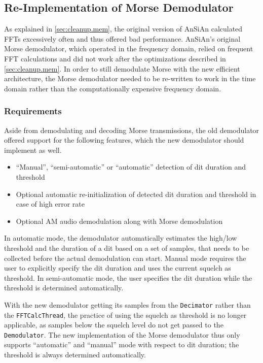 \subsection{Re-Implementation of Morse Demodulator\label{sec:morse_demod}}

As explained in \autoref{sec:cleanup.mem}, the original version of \ac{AnSiAn} calculated \acp{FFT} excessively often and thus offered bad performance. \ac{AnSiAn}'s original Morse demodulator, which operated in the frequency domain, relied on frequent \ac{FFT} calculations and did not work after the optimizations described in \autoref{sec:cleanup.mem}. In order to still demodulate Morse with the new efficient architecture, the Morse demodulator needed to be re-written to work in the time domain rather than the computationally expensive frequency domain.

\subsubsection{Requirements}

Aside from demodulating and decoding Morse transmissions, the old demodulator offered support for the following features, which the new demodulator should implement as well.

\begin{itemize}
  \item ``Manual'', ``semi-automatic'' or ``automatic'' detection of dit duration and threshold
  \item Optional automatic re-initialization of detected dit duration and threshold in case of high error rate
  \item Optional \ac{AM} audio demodulation along with Morse demodulation
\end{itemize}

In automatic mode, the demodulator automatically estimates the high/low threshold and the duration of a dit based on a set of samples, that needs to be collected before the actual demodulation can start. Manual mode requires the user to explicitly specify the dit duration and uses the current squelch as threshold. In semi-automatic mode, the user specifies the dit duration while the threshold is determined automatically.

With the new demodulator getting its samples from the \texttt{Decimator} rather than the \texttt{FFTCalcThread}, the practice of using the squelch as threshold is no longer applicable, as samples below the squelch level do not get passed to the \texttt{Demodulator}. The new implementation of the Morse demodulator thus only supports ``automatic'' and ``manual'' mode with respect to dit duration; the threshold is always determined automatically.


